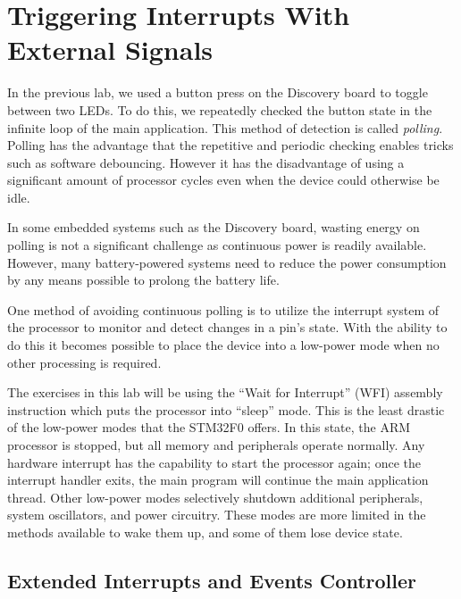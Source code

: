 \documentclass[11pt,fleqn]{book} %
\begin{document}

\section{Triggering Interrupts With External Signals}

In the previous lab, we used a button press on the Discovery board to toggle between two LEDs. To do this, we repeatedly checked the button state in the infinite loop of the main application. This method of detection is called \textit{polling}. Polling has the advantage that the repetitive and periodic checking enables tricks such as software debouncing. However it has the disadvantage of using a significant amount of processor cycles even when the device could otherwise be idle. 

In some embedded systems such as the Discovery board, wasting energy on polling is not a significant challenge as continuous power is readily available. However, many battery-powered systems need to reduce the power consumption by any means possible to prolong the battery life.

One method of avoiding continuous polling is to utilize the interrupt system of the processor to monitor and detect changes in a pin's state. With the ability to do this it becomes possible to place the device into a low-power mode when no other processing is required. 

The exercises in this lab will be using the ``Wait for Interrupt'' (WFI) assembly instruction which puts the processor into ``sleep'' mode. This is the least drastic of the low-power modes that the STM32F0 offers. In this state, the ARM processor is stopped, but all memory and peripherals operate normally. Any hardware interrupt has the capability to start the processor again; once the interrupt handler exits, the main program will continue the main application thread. Other low-power modes selectively shutdown additional peripherals, system oscillators, and power circuitry. These modes are more limited in the methods available to wake them up, and some of them lose device state.  

\subsection{Extended Interrupts and Events Controller} \label{exti}
\end{document}
